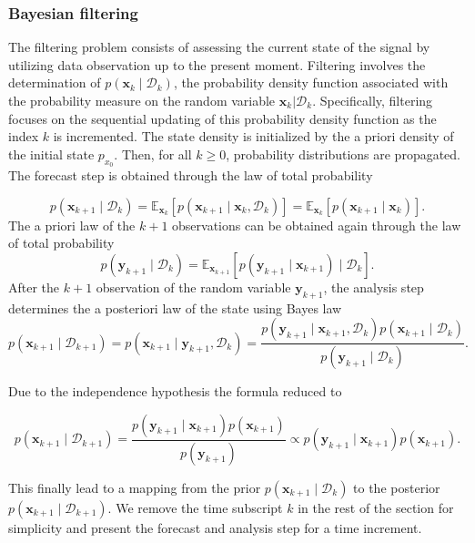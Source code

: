 \subsubsection{Bayesian filtering}

The filtering problem consists of assessing the current state of the signal by utilizing data observation up to the present moment. Filtering involves the determination of $p(\bm x_{k} \mid \mathcal{D}_{k})$, the probability density function associated with the probability measure on the random variable $\bm x_{k} | \mathcal D_{k}$. Specifically, filtering focuses on the sequential updating of this probability density function as the index $k$ is incremented.
The state density is initialized by the a priori density of the initial state $p_{x_0}$.
Then, for all $k \geq 0$, probability distributions are propagated.
The forecast step is obtained through the law of total probability

\begin{equation*}
    p(\bm x_{k+1} \mid \mathcal D_k) = \mathbb{E}_{\bm x_k}\left[p(\bm x_{k+1} \mid  \bm x_k,\mathcal{D}_k)\right] = \mathbb{E}_{\bm x_k}\left[p(\bm x_{k+1} \mid \bm x_k)\right].
\end{equation*}
The a priori law of the $k+1$ observations can be obtained again through the law of total probability
\begin{equation*}
    p(\bm y_{k+1} \mid \mathcal D_k) = \mathbb{E}_{\bm{x}_{k+1}}\left[p(\bm y_{k+1}\mid \bm x_{k+1}) \mid \mathcal D_k\right].
\end{equation*}
After the $k+1$ observation of the random variable $\bm y_{k+1}$, the analysis step determines the a posteriori law of the state using Bayes law
\begin{equation*}
    p(\bm x_{k+1} \mid \mathcal D_{k+1}) = p(\bm x_{k+1} \mid \bm y_{k+1}, \mathcal D_{k})  = \frac{p(\bm y_{k+1} \mid \bm x_{k+1} ,\mathcal D_k)  p(\bm x_{k+1}\mid \mathcal D_k)}{p(\bm y_{k+1}\mid \mathcal D_k)}.
\end{equation*}

Due to the independence hypothesis the formula reduced to

\begin{equation*}
    p(\bm x_{k+1} \mid \mathcal D_{k+1}) = \frac{p(\bm y_{k+1} \mid \bm x_{k+1})  p(\bm x_{k+1})}{p(\bm y_{k+1})} \propto p(\bm y_{k+1} \mid \bm x_{k+1})  p(\bm x_{k+1}).
\end{equation*}

This finally lead to a mapping from the prior $p(\bm x_{k+1} \mid \mathcal D_k)$ to the posterior $p(\bm x_{k+1} \mid \mathcal D_{k+1})$.
We remove the time subscript $k$ in the rest of the section for simplicity and present the forecast and analysis step for a time increment.

